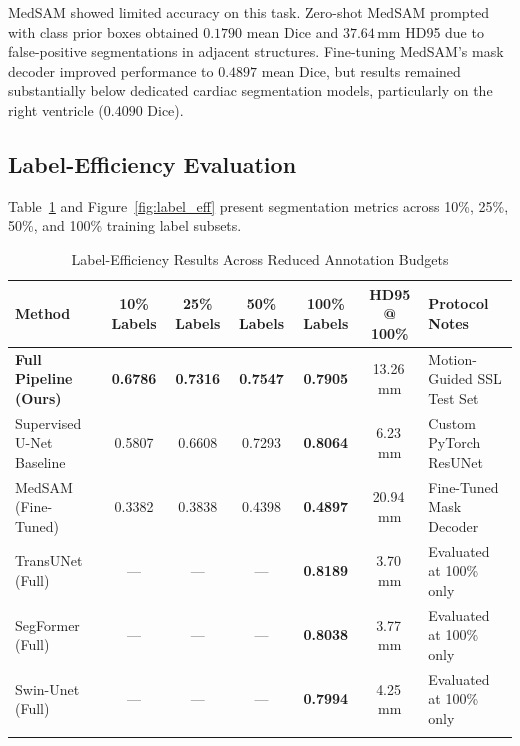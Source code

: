 \documentclass[pdflatex,sn-mathphys]{sn-jnl}
\theoremstyle{thmstyleone}
\theoremstyle{thmstyletwo}
\theoremstyle{thmstylethree}
\begin{document}
MedSAM showed limited accuracy on this task. Zero-shot MedSAM prompted with class prior boxes obtained $0.1790$ mean Dice and $37.64$\,mm HD95 due to false-positive segmentations in adjacent structures. Fine-tuning MedSAM's mask decoder improved performance to $0.4897$ mean Dice, but results remained substantially below dedicated cardiac segmentation models, particularly on the right ventricle ($0.4090$ Dice).

\subsection{Label-Efficiency Evaluation}
Table~\ref{tab:label_eff} and Figure~\ref{fig:label_eff} present segmentation metrics across 10\%, 25\%, 50\%, and 100\% training label subsets.

\begin{table}[htbp]
\caption{Label-Efficiency Results Across Reduced Annotation Budgets}%
\label{tab:label_eff}
\renewcommand{\arraystretch}{1.2}
\centering
\small
\setlength{\tabcolsep}{4.5pt}
\begin{tabular}{@{}lcccccp{3.0cm}@{}}
\toprule
\textbf{Method} & \textbf{10\% Labels} & \textbf{25\% Labels} & \textbf{50\% Labels} & \textbf{100\% Labels} & \textbf{HD95 @ 100\%} & \textbf{Protocol Notes} \\
\midrule
\textbf{Full Pipeline (Ours)} & \textbf{0.6786} & \textbf{0.7316} & \textbf{0.7547} & \textbf{0.7905} & 13.26\,mm & Motion-Guided SSL Test Set \\
Supervised U-Net Baseline      & 0.5807          & 0.6608          & 0.7293          & \textbf{0.8064} & 6.23\,mm  & Custom PyTorch ResUNet \\
MedSAM (Fine-Tuned)            & 0.3382          & 0.3838          & 0.4398          & \textbf{0.4897} & 20.94\,mm & Fine-Tuned Mask Decoder \\
TransUNet (Full)               & ---             & ---             & ---             & \textbf{0.8189} & 3.70\,mm  & Evaluated at 100\% only \\
SegFormer (Full)               & ---             & ---             & ---             & \textbf{0.8038} & 3.77\,mm  & Evaluated at 100\% only \\
Swin-Unet (Full)               & ---             & ---             & ---             & \textbf{0.7994} & 4.25\,mm  & Evaluated at 100\% only \\
\botrule
\end{tabular}
\end{table}
\end{document}

